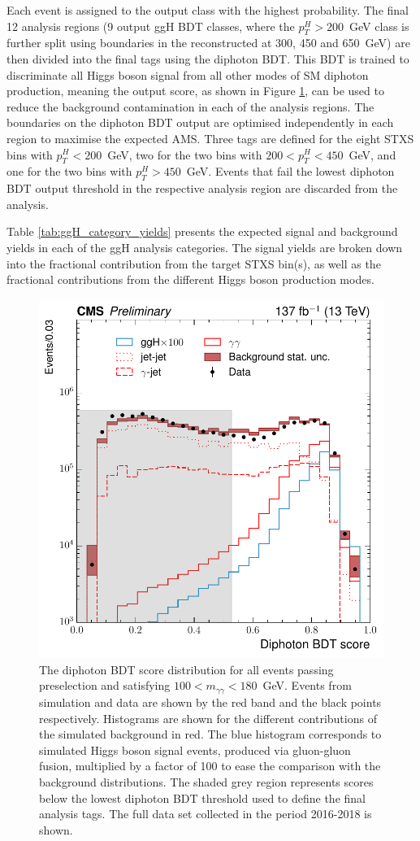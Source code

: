 Each event is assigned to the output class with the highest probability. The final 12 analysis regions (9 output ggH BDT classes, where the $p_T^H>200$~GeV class is further split using boundaries in the reconstructed \ptgg at 300, 450 and 650~GeV) are then divided into the final tags using the diphoton BDT. This BDT is trained to discriminate all Higgs boson signal from all other modes of SM diphoton production, meaning the output score, as shown in Figure \ref{fig:diphoton_score}, can be used to reduce the background contamination in each of the analysis regions. The boundaries on the diphoton BDT output are optimised independently in each region to maximise the expected AMS. Three tags are defined for the eight STXS bins with $p_T^H<200$~GeV, two for the two bins with $200<p_T^H<450$~GeV, and one for the two bins with $p_T^H>450$~GeV. Events that fail the lowest diphoton BDT output threshold in the respective analysis region are discarded from the analysis. 

Table \ref{tab:ggH_category_yields} presents the expected signal and background yields in each of the ggH analysis categories. The signal yields are broken down into the fractional contribution from the target STXS bin(s), as well as the fractional contributions from the different Higgs boson production modes.

\begin{figure}[hptb]
  \centering
  \includegraphics[width=.5\textwidth]{Figures/hgg_overview/DiphotonBDT.pdf}
  \caption[Diphoton BDT output distribution]
  {
    The diphoton BDT score distribution for all events passing preselection and satisfying $100<m_{\gamma\gamma}<180$~GeV. Events from simulation and data are shown by the red band and the black points respectively. Histograms are shown for the different contributions of the simulated background in red. The blue histogram corresponds to simulated Higgs boson signal events, produced via gluon-gluon fusion, multiplied by a factor of 100 to ease the comparison with the background distributions. The shaded grey region represents scores below the lowest diphoton BDT threshold used to define the final analysis tags. The full data set collected in the period 2016-2018 is shown.
  }
  \label{fig:diphoton_score}
\end{figure}

